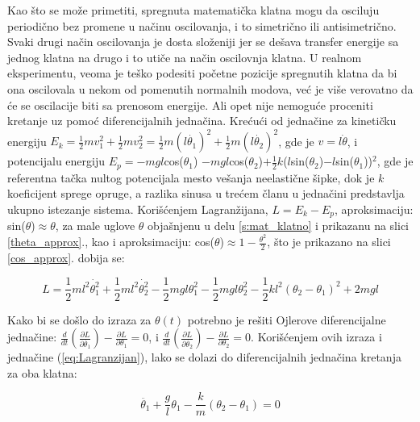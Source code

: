 \documentclass[a4paper, 12pt, diplomski]{etf}
\begin{document}
\noindent
Kao što se može primetiti, spregnuta matematička klatna mogu da osciluju periodično bez promene u načinu oscilovanja, i to simetrično ili antisimetrično. Svaki drugi način oscilovanja je dosta složeniji jer se dešava transfer energije sa jednog klatna na drugo i to utiče na način oscilovnja klatna. U realnom eksperimentu, veoma je teško podesiti početne pozicije spregnutih klatna da bi ona oscilovala u nekom od pomenutih normalnih modova, već je više verovatno da će se oscilacije biti sa prenosom energije. Ali opet nije nemoguće proceniti kretanje uz pomoć diferencijalnih jednačina. Krećući od jednačine za kinetičku energiju $E_k = \frac{1}{2}mv_1^2 + \frac{1}{2}mv_2^2 = \frac{1}{2}m(l\dot{\theta_1})^2 + \frac{1}{2}m(l\dot{\theta_2})^2$, gde je $v = l \dot{\theta}$, i potencijalu energiju $E_p = -mgl$cos($\theta_1$) $-mgl$cos($\theta_2$)$+\frac{1}{2}k$($l$sin($\theta_2$)$-l$sin($\theta_1$))$^2$, gde je referentna tačka nultog potencijala mesto vešanja neelastične šipke, dok je $k$ koeficijent sprege opruge, a razlika sinusa u trećem članu u jednačini predstavlja ukupno istezanje sistema. Korišćenjem Lagranžijana, $L = E_k - E_p$, aproksimaciju: sin($\theta$)$\approx \theta$, za male uglove $\theta$ objašnjenu u delu \ref{s:mat_klatno} i prikazanu na slici \ref{theta_approx}., kao i aproksimaciju: cos($\theta$)$\approx 1 - \frac{\theta^2}{2}$, što je prikazano na slici \ref{cos_approx}. dobija se: 

\begin{equation}
L = \frac{1}{2}ml^2\dot{\theta_1^2} + \frac{1}{2}ml^2\dot{\theta_2^2} - \frac{1}{2}mgl\theta_1^2 - \frac{1}{2}mgl\theta_2^2 - \frac{1}{2}kl^2(\theta_2 - \theta_1)^2 + 2mgl
\label{eq:Lagranzijan}
\end{equation}



\noindent
Kako bi se došlo do izraza za $\theta(t)$ potrebno je rešiti Ojlerove diferencijalne jednačine: $\frac{d}{dt} \left( \frac{\partial L}{\partial \dot{\theta_1}} \right) - \frac{\partial L}{\partial \theta_1} = 0$, i $\frac{d}{dt} \left( \frac{\partial L}{\partial \dot{\theta_2}} \right) - \frac{\partial L}{\partial \theta_2} = 0$. Korišćenjem ovih izraza i jednačine (\ref{eq:Lagranzijan}), lako se dolazi do diferencijalnih jednačina kretanja za oba klatna: 


\begin{equation}
\ddot{\theta_1} + \frac{g}{l} \theta_1 - \frac{k}{m}(\theta_2 - \theta_1) = 0
\label{eq:diff1}
\end{equation}
\end{document}
